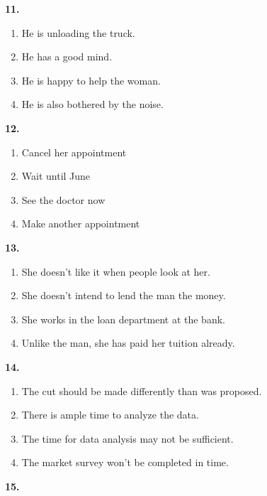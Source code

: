 \documentclass[12pt]{article}
\begin{document}
\par
\vspace{0.25\baselineskip}
\noindent\textbf{11.}
\begin{enumerate}[label=(\Alph*),leftmargin=*,itemsep=0.2em]
\item He is unloading the truck.
\item He has a good mind.
\item He is happy to help the woman.
\item He is also bothered by the noise.
\end{enumerate}
\par
\vspace{0.25\baselineskip}
\noindent\textbf{12.}
\begin{enumerate}[label=(\Alph*),leftmargin=*,itemsep=0.2em]
\item Cancel her appointment
\item Wait until June
\item See the doctor now
\item Make another appointment
\end{enumerate}
\par
\vspace{0.25\baselineskip}
\noindent\textbf{13.}
\begin{enumerate}[label=(\Alph*),leftmargin=*,itemsep=0.2em]
\item She doesn't like it when people look at her.
\item She doesn't intend to lend the man the money.
\item She works in the loan department at the bank.
\item Unlike the man, she has paid her tuition already.
\end{enumerate}
\par
\vspace{0.25\baselineskip}
\noindent\textbf{14.}
\begin{enumerate}[label=(\Alph*),leftmargin=*,itemsep=0.2em]
\item The cut should be made differently than was proposed.
\item There is ample time to analyze the data.
\item The time for data analysis may not be sufficient.
\item The market survey won't be completed in time.
\end{enumerate}
\par
\vspace{0.25\baselineskip}
\noindent\textbf{15.}
\end{document}
